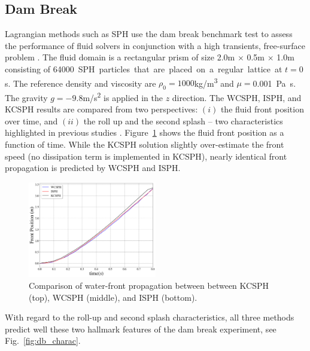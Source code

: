 \subsection{Dam Break}
\label{subsec:damBreak}
Lagrangian methods such as SPH use the dam break benchmark test to assess the performance of fluid solvers in conjunction with a high transients, free-surface problem \cite{Martin1952,colagrossi2003numerical,hughes2010comparison,xu2016improved,miladHalfImplicit2018}. The fluid domain is a rectangular prism of size 2.0\si{m} $\times$ 0.5\si{m} $\times$ 1.0\si{m} consisting of \SI{64000} SPH particles that are placed on a regular lattice at $t=0$\si{s}. The reference density and viscosity are $\rho_0=1000$\si{kg/m^3} and $\mu=$\SI{0.001}{Pa.s}. The gravity $g=-9.8$\si{m/s^2} is applied in the  $z$ direction. The WCSPH, ISPH, and KCSPH results are compared from two perspectives: $(i)$ the fluid front position over time, and $(ii)$ the roll up and the second splash -- two characteristics highlighted in previous studies \cite{colagrossi2003numerical,Adami2012}. Figure~\ref{fig:db_front} shows the fluid front position as a function of time. While the KCSPH solution slightly over-estimate the front speed (no dissipation term is implemented in KCSPH), nearly identical front propagation is predicted by WCSPH and ISPH. 
\begin{figure}%
	\begin{center}
		\includegraphics[width=0.5\textwidth]{images/SPH_Comparison/Figure_damBreak.png}
	\end{center}
	\vspace{-10pt}
	\caption{Comparison of water-front propagation between between KCSPH (top), WCSPH (middle), and ISPH (bottom).}
	\label{fig:db_front}
\end{figure}
With regard to the roll-up and second splash characteristics, all three methods predict well these two hallmark features of the dam break experiment, see Fig.~\ref{fig:db_charac}.
